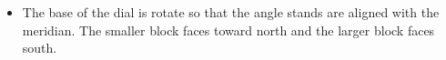 \documentclass[final]{beamer}
\begin{document}
\begin{frame}
\begin{columns}[t]
\begin{column}[t]{0.24 \textwidth}
\begin{itemize}
\item The base of the dial is rotate so that the angle stands are aligned
with the meridian. The smaller block faces toward north and the larger block 
faces south.

\begin{center}
\end{center}


\end{itemize}
\end{column}
\end{columns}
\end{frame}
\end{document}
